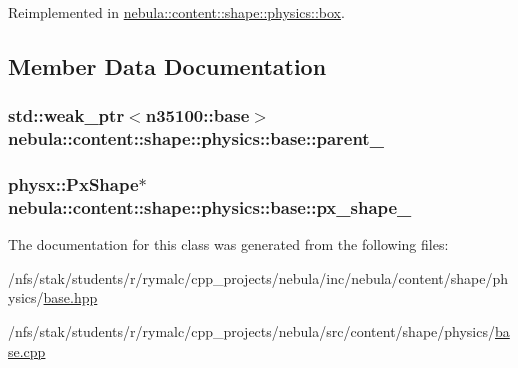 Reimplemented in \hyperlink{classnebula_1_1content_1_1shape_1_1physics_1_1box_a798aaaef8d3f5535e3aea4eabf19924c}{nebula::content::shape::physics::box}.

\subsection{Member Data Documentation}
\hypertarget{classnebula_1_1content_1_1shape_1_1physics_1_1base_a13636651ca2a639522b1effe0e86990e}{
\subsubsection[{parent\_\-}]{\setlength{\rightskip}{0pt plus 5cm}std::weak\_\-ptr$<${\bf n35100::base}$>$ {\bf nebula::content::shape::physics::base::parent\_\-}}}
\label{classnebula_1_1content_1_1shape_1_1physics_1_1base_a13636651ca2a639522b1effe0e86990e}
\hypertarget{classnebula_1_1content_1_1shape_1_1physics_1_1base_a41958a55327eaa6c06f11c7ca9496bd0}{
\subsubsection[{px\_\-shape\_\-}]{\setlength{\rightskip}{0pt plus 5cm}physx::PxShape$\ast$ {\bf nebula::content::shape::physics::base::px\_\-shape\_\-}}}
\label{classnebula_1_1content_1_1shape_1_1physics_1_1base_a41958a55327eaa6c06f11c7ca9496bd0}


The documentation for this class was generated from the following files:\begin{DoxyCompactItemize}
\item 
/nfs/stak/students/r/rymalc/cpp\_\-projects/nebula/inc/nebula/content/shape/physics/\hyperlink{inc_2nebula_2content_2shape_2physics_2base_8hpp}{base.hpp}\item 
/nfs/stak/students/r/rymalc/cpp\_\-projects/nebula/src/content/shape/physics/\hyperlink{src_2content_2shape_2physics_2base_8cpp}{base.cpp}\end{DoxyCompactItemize}
